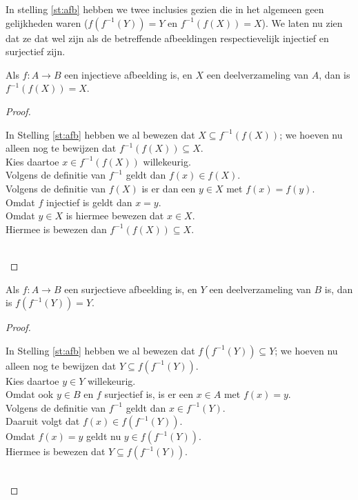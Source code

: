In stelling \ref{st:afb} hebben we twee inclusies gezien die in het algemeen geen gelijkheden waren ($f(f^{-1}(Y))=Y$ en $f^{-1}(f(X))=X$). We laten nu zien dat ze dat wel zijn als de betreffende afbeeldingen respectievelijk injectief en surjectief zijn.
\begin{theorem}\label{th:injectief}
Als $f:A\rightarrow B$ een injectieve afbeelding is, en $X$ een deelverzameling van $A$, dan is $f^{-1}(f(X))=X$.
\end{theorem}
\begin{proof}\mbox{}\\
\indent\begin{minipage}{0.9\textwidth}
In Stelling \ref{st:afb} hebben we al bewezen dat $X\subseteq f^{-1}(f(X))$; we hoeven nu alleen nog te bewijzen dat $f^{-1}(f(X))\subseteq X$.\\[1.5pt]
Kies daartoe $x\in f^{-1}(f(X))$ willekeurig.\\[1.5pt]
Volgens de definitie van $f^{-1}$ geldt dan $f(x)\in f(X)$.\\[1.5pt]
Volgens de definitie van $f(X)$ is er dan een $y\in X$ met $f(x)=f(y)$.\\[1.5pt]
Omdat $f$ injectief is geldt dan $x=y$.\\[1.5pt]
Omdat $y\in X$ is hiermee bewezen dat $x\in X$.\\[1.5pt]
Hiermee is bewezen dan $f^{-1}(f(X))\subseteq X$.
\end{minipage}\\
\end{proof}
\begin{theorem}\label{th:surjectief}
Als $f:A\rightarrow B$ een surjectieve afbeelding is, en $Y$ een deelverzameling van $B$ is, dan is $f(f^{-1}(Y))=Y$.
\end{theorem}
\begin{proof}\mbox{}\\
\indent\begin{minipage}{0.9\textwidth}
In Stelling \ref{st:afb} hebben we al bewezen dat $f(f^{-1}(Y))\subseteq Y$; we hoeven nu alleen nog te bewijzen dat $Y\subseteq f(f^{-1}(Y))$.\\[1.5pt]
Kies daartoe $y\in Y$ willekeurig.\\[1.5pt]
Omdat ook $y\in B$ en $f$ surjectief is, is er een $x\in A$ met $f(x)=y$.\\[1.5pt]
Volgens de definitie van $f^{-1}$ geldt dan $x\in f^{-1}(Y)$.\\[1.5pt]
Daaruit volgt dat $f(x)\in f(f^{-1}(Y))$.\\[1.5pt]
Omdat $f(x) = y$ geldt nu $y\in f(f^{-1}(Y))$.\\[1.5pt]
Hiermee is bewezen dat $Y\subseteq f(f^{-1}(Y))$.
\end{minipage}\\
\end{proof}

